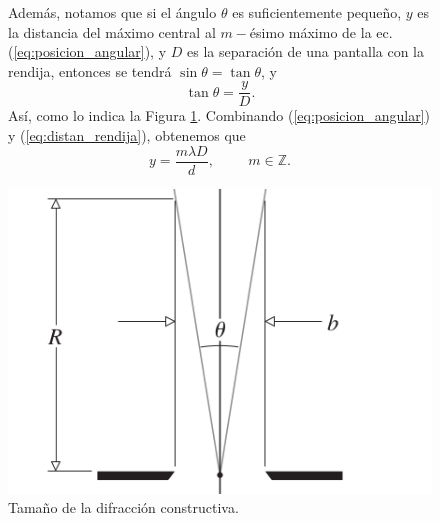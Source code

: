 \documentclass[12pt,a4paper]{article}
\begin{document}
\begin{figure}[hbtp!]
	\begin{minipage}{0.5\linewidth}
		Además, notamos que si el ángulo \(\theta\) es suficientemente pequeño, \(y\) es la distancia del máximo central al \(m-\)ésimo máximo de la ec. (\ref{eq:posicion_angular}), y \(D\) es la separación de una pantalla con la rendija, entonces se tendrá \(\sin \theta = \tan \theta\), y \vspace{-3mm}
		\begin{equation}
			\tan \theta = \dfrac{y}{D}.
			\label{eq:distan_rendija}
		\end{equation}
		Así, como lo indica la Figura \ref{fig:constructiva}. Combinando (\ref{eq:posicion_angular}) y (\ref{eq:distan_rendija}), obtenemos que
		\begin{equation}
			y = \dfrac{m \lambda D}{d} , \hspace{1cm} m \in \mathds{Z} .
			\label{eq:altura}
		\end{equation}
	\end{minipage}\hspace{5mm}
	\begin{minipage}{0.5\linewidth}
		\centering
		\includegraphics[width= 0.8 \linewidth]{1_INTRO/distancia}
		\caption{Tamaño de la difracción constructiva.}
		\label{fig:constructiva}
	\end{minipage}
\end{figure}
\end{document}
